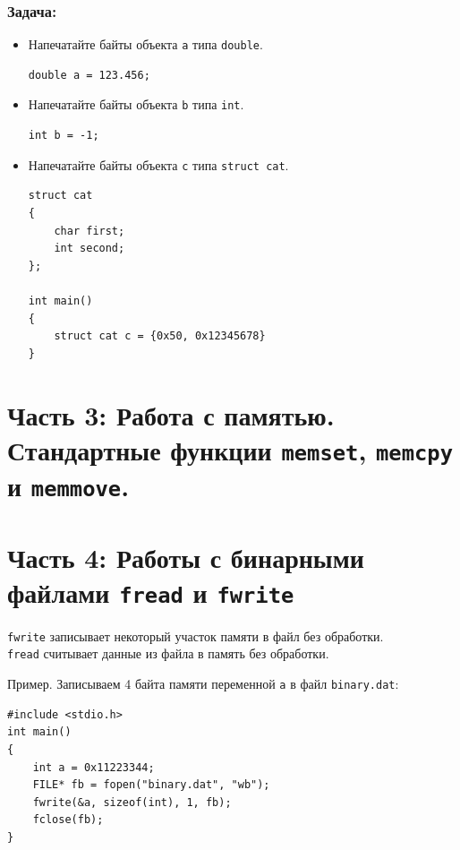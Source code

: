 \documentclass{article}
\begin{document}
\subsubsection*{Задача:}

\begin{itemize}
\item Напечатайте байты объекта \texttt{a} типа \texttt{double}.
\begin{lstlisting} 
double a = 123.456;
\end{lstlisting}

\item Напечатайте байты объекта \texttt{b} типа \texttt{int}.
\begin{lstlisting} 
int b = -1;
\end{lstlisting}

\item Напечатайте байты объекта \texttt{c} типа \texttt{struct cat}.
\begin{lstlisting} 
struct cat
{
    char first;
    int second;
};

int main()
{
    struct cat c = {0x50, 0x12345678}
}

\end{lstlisting}


\end{itemize}



\section*{Часть 3: Работа с памятью. Стандартные функции \texttt{memset}, \texttt{memcpy} и \texttt{memmove}.}




\newpage
\section*{Часть 4: Работы с бинарными файлами \texttt{fread} и \texttt{fwrite}}
\texttt{fwrite} записывает некоторый участок памяти в файл без обработки. \\
\texttt{fread} считывает данные из файла в память без обработки.

Пример. Записываем 4 байта памяти переменной \texttt{a} в файл \texttt{binary.dat}:
\begin{lstlisting}
#include <stdio.h>
int main() 
{
    int a = 0x11223344;
    FILE* fb = fopen("binary.dat", "wb");
    fwrite(&a, sizeof(int), 1, fb);
    fclose(fb);
}
\end{lstlisting}
\end{document}
